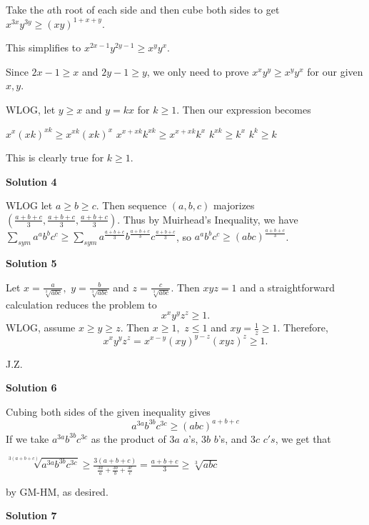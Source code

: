 \begin{enumerate}
 Take the $a$th root of each side and then cube both sides to get $x^{3x}y^{3y} \ge (xy)^{1 + x + y}$.

 This simplifies to $x^{2x-1}y^{2y-1} \ge x^{y}y^{x}$.

 Since $2x - 1 \ge x$ and $2y - 1 \ge y$, we only need to prove $x^{x}y^{y} \ge x^{y}y^{x}$ for our given $x, y$.

 WLOG, let $y \ge x$ and $y =kx$ for $k \ge 1$. Then our expression becomes 

 $x^{x}(xk)^{xk} \ge x^{xk}(xk)^{x}$
$x^{x+xk}k^{xk} \ge x^{x+xk}k^{x}$
$k^{xk} \ge k^{x}$
$k^k \ge k$

 This is clearly true for $k \ge 1$.

 



\textbf{Solution 4}

WLOG let $a\ge b\ge c$. Then sequence $(a,b,c)$ majorizes $(\frac{a+b+c}{3},\frac{a+b+c}{3},\frac{a+b+c}{3})$. Thus by Muirhead's Inequality, we have $\sum_{sym} a^ab^bc^c \ge \sum_{sym} a^{\frac{a+b+c}{3}}b^{\frac{a+b+c}{3}}c^{\frac{a+b+c}{3}}$, so $a^ab^bc^c \ge (abc)^{\frac{a+b+c}{3}}$.

 



\textbf{Solution 5}

Let $x=\frac{a}{\sqrt[3]{abc}},$ $y=\frac{b}{\sqrt[3]{abc}}$ and $z=\frac{c}{\sqrt[3]{abc}}.$ Then $xyz=1$ and a straightforward calculation reduces the problem to 
 \[x^xy^yz^z \ge 1.\]WLOG, assume $x\ge y\ge z.$ Then $x\ge 1,$ $z\le 1$ and $xy=\frac{1}{z} \ge 1.$ Therefore,
 \[x^xy^yz^z=x^{x-y}(xy)^{y-z}(xyz)^z \ge 1.\]

 J.Z.

 



\textbf{Solution 6}

Cubing both sides of the given inequality gives 
 \[a^{3a}b^{3b}c^{3c}\ge(abc)^{a+b+c}\]If we take $a^{3a}b^{3b}c^{3c}$ as the product of $3a$ $a$'s, $3b$ $b$'s, and $3c$ $c's$, we get that 

 $\sqrt[3(a+b+c)]{a^{3a}b^{3b}c^{3c}}\ge\frac{3(a+b+c)}{\frac{3a}{a}+\frac{3b}{b}+\frac{3c}{c}}=\frac{a+b+c}{3}\ge\sqrt[3]{abc}$

 

 by GM-HM, as desired.

 



\textbf{Solution 7}


\end{enumerate}
